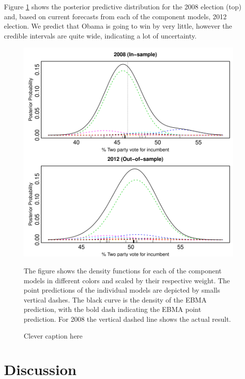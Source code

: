 \documentclass[12pt,fullpage,endnotes]{article}
\begin{document}
Figure \ref{pres} shows the posterior predictive distribution for the
2008 election (top) and, based on current forecasts from each of the
component models, 2012 election.  We predict that Obama is going to
win by very little, however the credible intervals are quite wide, indicating a lot of uncertainty.

\begin{figure}[h]
\caption{Clever caption here}
\label{pres}
\begin{center}
\includegraphics[scale=.8]{presForecast}
\end{center}
The figure shows the density functions for each of the component models in different colors and scaled by their respective weight. The point predictions of the individual models are depicted by smalls vertical dashes. The black curve is the density of the EBMA prediction, with the bold dash indicating the EBMA point prediction. For 2008 the vertical dashed line shows the actual result.
\end{figure}





\section{Discussion} 
\end{document}
